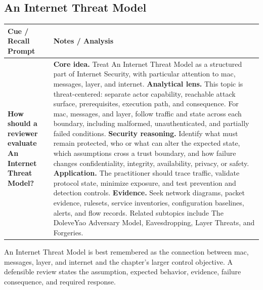 \documentclass[11pt]{article}
\newcommand{\CornellHeader}{%
\rowcolor{Navy}\color{white}\bfseries Cue / Recall Prompt & \color{white}\bfseries Notes / Analysis\\\hline}
\newcommand{\CornellRow}[2]{%
\cellcolor{CueGray}\RaggedRight\textbf{#1} & \RaggedRight #2\\\hline}
\begin{document}
\subsection*{An Internet Threat Model}
\begin{longtable}{>{\RaggedRight\arraybackslash}p{}|>{\RaggedRight\arraybackslash}p{}}
\CornellHeader
\CornellRow{How should a reviewer evaluate An Internet Threat Model?}{\textbf{Core idea.} Treat An Internet Threat Model as a structured part of Internet Security, with particular attention to mac, messages, layer, and internet. \textbf{Analytical lens.} This topic is threat-centered: separate actor capability, reachable attack surface, prerequisites, execution path, and consequence. For mac, messages, and layer, follow traffic and state across each boundary, including malformed, unauthenticated, and partially failed conditions. \textbf{Security reasoning.} Identify what must remain protected, who or what can alter the expected state, which assumptions cross a trust boundary, and how failure changes confidentiality, integrity, availability, privacy, or safety. \textbf{Application.} The practitioner should trace traffic, validate protocol state, minimize exposure, and test prevention and detection controls. \textbf{Evidence.} Seek network diagrams, packet evidence, rulesets, service inventories, configuration baselines, alerts, and flow records. Related subtopics include The DoleveYao Adversary Model, Eavesdropping, Layer Threats, and Forgeries.}
\end{longtable}
\begin{topicsummary}
An Internet Threat Model is best remembered as the connection between mac, messages, layer, and internet and the chapter's larger control objective. A defensible review states the assumption, expected behavior, evidence, failure consequence, and required response.
\end{topicsummary}
\end{document}
